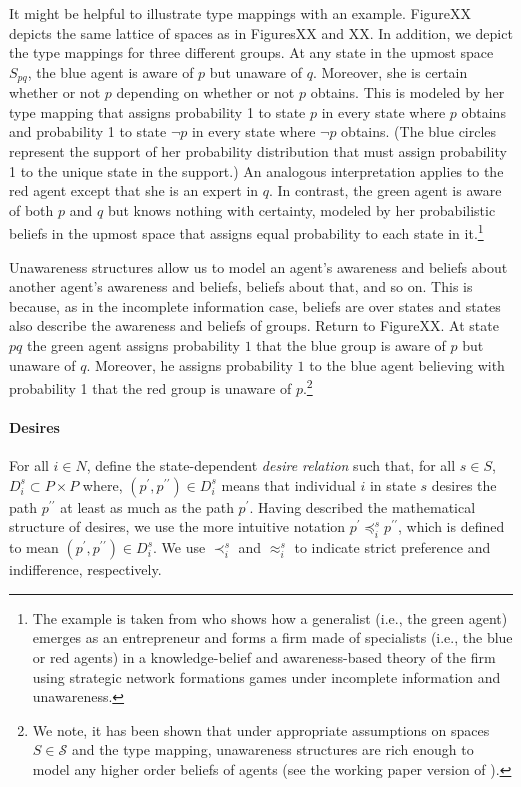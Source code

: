 \documentclass[
11pt,
titlepage,
reqno,
]{article}%
\theoremstyle{definition}
\begin{document}
It might be helpful to illustrate type mappings with an example. FigureXX depicts the same lattice of spaces as in FiguresXX and XX. In addition, we depict the type mappings for three different groups. At any state in the upmost space $S_{pq}$, the blue agent is aware of $p$ but unaware of $q$. Moreover, she is certain whether or not $p$ depending on whether or not $p$ obtains. This is modeled by her type mapping that assigns probability 1 to state $p$ in every state where $p$ obtains and probability 1 to state $\neg p$ in every state where $\neg p$ obtains. (The blue circles represent the support of her probability distribution that must assign probability 1 to the unique state in the support.) An analogous interpretation applies to the red agent except that she is an expert in $q$. In contrast, the green agent is aware of both $p$ and $q$ but knows nothing with certainty, modeled by her probabilistic beliefs in the upmost space that assigns equal probability to each state in it.\footnote{The example is taken from \citet{Schipper2016} who shows how a generalist (i.e., the green agent) emerges as an entrepreneur and forms a firm made of specialists (i.e., the blue or red agents) in a knowledge-belief and awareness-based theory of the firm using strategic network formations games under incomplete information and unawareness.}

Unawareness structures allow us to model an agent's awareness and beliefs about another agent's awareness and beliefs, beliefs about that, and so on. This is because, as in the incomplete information case,  beliefs are over states and states also describe the awareness and beliefs of groups.  Return to FigureXX. At state $pq$ the green agent assigns probability $1$ that the blue group is aware of $p$ but unaware of $q$. Moreover, he assigns probability $1$ to the blue agent believing with probability 1 that the red group is unaware of $p$.\footnote{We  note, it has been shown that under appropriate assumptions on spaces $S \in \mathcal{S}$ and the type mapping, unawareness structures are rich enough to model any higher order beliefs of agents (see the working paper version of \citet{Heifetz2013}).}
	
\paragraph{Desires \label{para: desires}}
	For all $i\in N$, define the state-dependent \textit{desire relation} such that, for all $s\in S$,   $D_i^s\subset P\times P$ where, $(p^\prime,p^{\prime\prime})\in D_i^s$ means that  individual $i$ in state $s$ desires the path $p^{\prime\prime}$ at least as much as the path $p^\prime$. 
	Having described the mathematical structure of desires, we use the more intuitive notation $p^\prime\preceq_i^s p^{\prime\prime}$, which is defined to mean $(p^\prime,p^{\prime\prime})\in D_i^s$. 
	We use $\prec_i^s$ and $\approx_i^s$ to indicate strict preference and indifference, respectively. 
	
\end{document}
